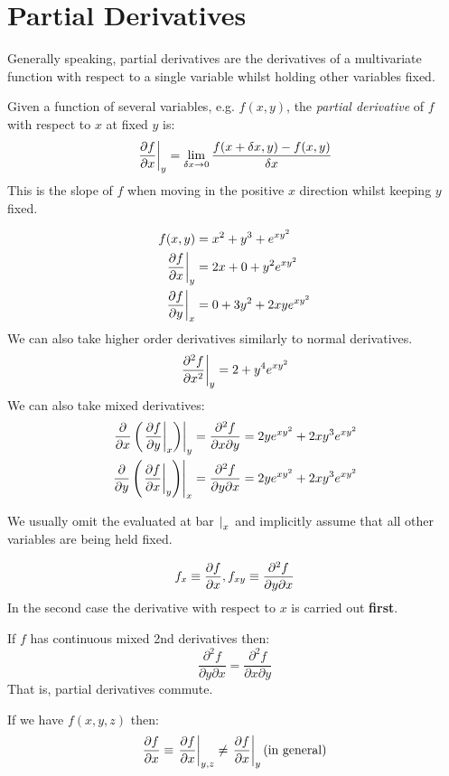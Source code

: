 \documentclass[../main.tex]{subfiles}
\begin{document}
\section{Partial Derivatives}
Generally speaking, partial derivatives are the derivatives of a multivariate function with respect to a single variable whilst holding other variables fixed.
\begin{definition}
  Given a function of several variables, e.g. $f(x, y)$, the \textit{partial derivative} of $f$ with respect to $x$ at fixed $y$ is:
  \[
    \at{\pderiv{f}{x}}{y} = \lim_{\delta x \to 0} \frac{f(x + \delta x, y) - f(x, y)}{\delta x}
  \]
  This is the slope of $f$ when moving in the positive $x$ direction whilst keeping $y$ fixed.
\end{definition}
\begin{example}
  \begin{align*}
    f(x, y) &= x^2 + y^3 + e^{xy^2} \\
    \at{\pderiv{f}{x}}{y} &= 2x+0+y^2e^{xy^2} \\
    \at{\pderiv{f}{y}}{x} &= 0 + 3y^2 + 2xye^{xy^2}\\
  \end{align*}
  We can also take higher order derivatives similarly to normal derivatives.
  \[
    \at{\pderiv[2]{f}{x}}{y} = 2 +y^4e^{xy^2}
  \]
  We can also take mixed derivatives:
  \begin{align*}
    \at{\pderiv{}{x}\left(\at{\pderiv{f}{y}}{x}\right)}{y} &= \frac{\partial^2 f}{\partial x \partial y} =2ye^{xy^2} + 2xy^3 e^{xy^2} \\
    \at{\pderiv{}{y}\left(\at{\pderiv{f}{x}}{y}\right)}{x} &= \frac{\partial^2 f}{\partial y \partial x} =2ye^{xy^2} + 2xy^3 e^{xy^2}
  \end{align*}
\end{example}
\begin{remark}[Notation]
  We usually omit the evaluated at bar $\left.  \right|_{x}$ and implicitly assume that all other variables are being held fixed.
\end{remark}
\begin{remark}
  \[
    f_x \equiv \pderiv{f}{x}, f_{xy} \equiv \frac{\partial^2 f}{\partial y \partial x}
  \]
  In the second case the derivative with respect to $x$ is carried out \textbf{first}.
\end{remark}
\begin{theorem}
  If $f$ has continuous mixed 2nd derivatives then:
  \[
    \frac{\partial^2 f}{\partial y \partial x} = \frac{\partial^2 f}{\partial x \partial y}
  \]
  That is, partial derivatives commute.
\end{theorem}
\begin{remark}
  If we have $f(x, y, z)$ then:
  \[
    \pderiv{f}{x} \equiv \at{\pderiv{f}{x}}{y, z} \neq \at{\pderiv{f}{x}}{y} \text{(in general)}
  \]
\end{remark}
\end{document}
